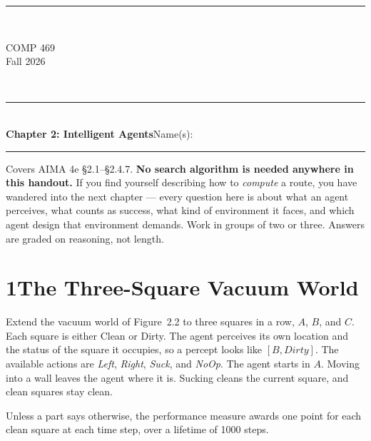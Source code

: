 \documentclass[11pt]{article}
\newif\ifsol
\newcommand{\masthead}[3]{%
  \noindent\rule{\textwidth}{2pt}\\[2pt]
  \noindent
  \begin{minipage}[b]{0.45\textwidth}
    {\Large #1}\\{\Large #2}
  \end{minipage}
  \hfill
  \begin{minipage}[b]{0.5\textwidth}
    \raggedleft{\huge #3}
  \end{minipage}\\[4pt]
  \noindent\rule{\textwidth}{2pt}\\[-4pt]
}
\newcommand{\qhead}[1]{\section*{#1}}
\begin{document}
\masthead{COMP 469}{Fall 2026}{Take-Home Discussion 2}

\vspace{6pt}
{\large\textbf{Chapter 2: Intelligent Agents}}\hfill Name(s):\enspace\rule{2.4in}{0.4pt}

\vspace{2pt}
Covers AIMA 4e \S2.1--\S2.4.7. \textbf{No search algorithm is needed anywhere in this
handout.} If you find yourself describing how to \emph{compute} a route, you have wandered
into the next chapter --- every question here is about what an agent perceives, what counts
as success, what kind of environment it faces, and which agent design that environment
demands. Work in groups of two or three. Answers are graded on reasoning, not length.

\ifsol
\vspace{2pt}
{\color{solblue}\textbf{INSTRUCTOR EDITION.} Solutions shown in green italics.}
\fi

\qhead{1\quad The Three-Square Vacuum World}

Extend the vacuum world of Figure~2.2 to three squares in a row, $A$, $B$, and $C$. Each
square is either Clean or Dirty. The agent perceives its own location and the status of
the square it occupies, so a percept looks like $[B,\textit{Dirty}]$. The available actions
are \textit{Left}, \textit{Right}, \textit{Suck}, and \textit{NoOp}. The agent starts in $A$.
Moving into a wall leaves the agent where it is. Sucking cleans the current square, and
clean squares stay clean.

\begin{center}
\end{center}

Unless a part says otherwise, the performance measure awards one point for each clean
square at each time step, over a lifetime of 1000 steps.
\end{document}
